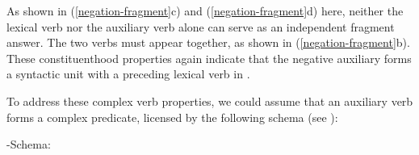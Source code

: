 \documentclass[output=paper
	        ,collection
	        ,collectionchapter
 	        ,biblatex
                ,babelshorthands
                ,newtxmath
                ,draftmode
                ,colorlinks, citecolor=brown
]{langscibook}
\begin{document}
\begin{exe}
\begin{xlist}
\begin{exe}
\begin{xlist}
\eal
\label{negation-fragment}
\zl

%
%
%
%
As shown in (\ref{negation-fragment}c) and (\ref{negation-fragment}d) here, neither the lexical verb nor the auxiliary verb alone can serve as an independent fragment answer. The two
verbs must appear together, as shown in (\ref{negation-fragment}b). These constituenthood
properties again indicate that the negative auxiliary forms
a syntactic unit with a preceding lexical  verb in .

To address these complex verb properties, we could assume that
an auxiliary verb forms a complex predicate, licensed by
the following schema (see \citealt{Bratt:96, Chung:98,Kim:16}):


\ea
\label{negation-hd-lex-cxt}
\head-\LIGHT Schema:\\
\z


\end{xlist}
\end{exe}
\end{xlist}
\end{exe}
\end{document}
